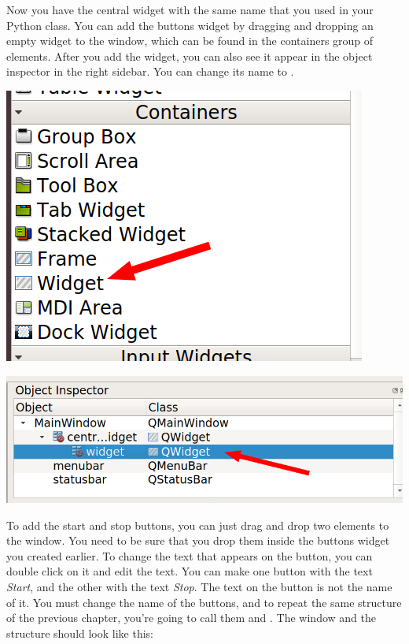 Now you have the central widget with the same name that you used in your Python class. You can add the buttons widget by dragging and dropping an empty widget to the window, which can be found in the containers group of elements. After you add the widget, you can also see it appear in the object inspector in the right sidebar. You can change its name to .

\begin{minipage}{0.45\linewidth}
    \centering
    \includegraphics[width=\textwidth]{images/Chapter_09/04_empty_widget.png}
\end{minipage}
\hspace{0.5cm}
\begin{minipage}{0.45\linewidth}
    \centering
    \includegraphics[width=\textwidth]{images/Chapter_09/04_empty_widget_structure.png}
\end{minipage}

To add the start and stop buttons, you can just drag and drop two  elements to the window. You need to be sure that you drop them inside the buttons widget you created earlier. To change the text that appears on the button, you can double click on it and edit the text. You can make one button with the text \emph{Start}, and the other with the text \emph{Stop}. The text on the button is not the name of it. You must change the name of the buttons, and to repeat the same structure of the previous chapter, you're going to call them  and . The window and the structure should look like this:

